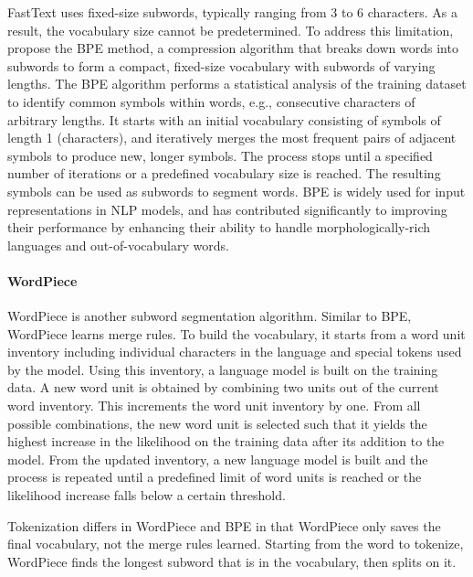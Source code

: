 FastText uses fixed-size subwords, typically ranging from 3 to 6 characters. As a result, the vocabulary size cannot be predetermined. To address this limitation, \citet{gage1994new} propose the \ac{BPE} method, a compression algorithm that breaks down words into subwords to form a compact, fixed-size vocabulary with subwords of varying lengths. The \ac{BPE} algorithm performs a statistical analysis of the training dataset to identify common symbols within words, e.g., consecutive characters of arbitrary lengths. It starts with an initial vocabulary consisting of symbols of length 1 (characters), and iteratively merges the most frequent pairs of adjacent symbols to produce new, longer symbols. The process stops until a specified number of iterations or a predefined vocabulary size is reached. The resulting symbols can be used as subwords to segment words. \ac{BPE} is widely used for input representations in \ac{NLP} models, and has contributed significantly to improving their performance by enhancing their ability to handle morphologically-rich languages and out-of-vocabulary words.

\paragraph{WordPiece}

WordPiece \citep{wu2016google} is another subword segmentation algorithm. Similar to \ac{BPE}, WordPiece learns merge rules. To build the vocabulary, it starts from a word unit inventory including individual characters in the language and special tokens used by the model. Using this inventory, a language model is built on the training data. A new word unit is obtained by combining two units out of the current word inventory. This increments the word unit inventory by one. From all possible combinations, the new word unit is selected such that it yields the highest increase in the likelihood on the training data after its addition to the model. From the updated inventory, a new language model is built and the process is repeated until a predefined limit of word units is reached or the likelihood increase falls below a certain threshold. 

Tokenization differs in WordPiece and \ac{BPE} in that WordPiece only saves the final vocabulary, not the merge rules learned. Starting from the word to tokenize, WordPiece finds the longest subword that is in the vocabulary, then splits on it. 


